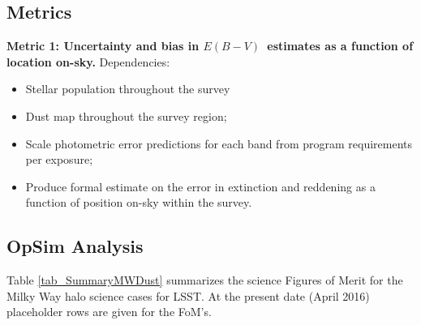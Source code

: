 
\subsection{Metrics}

\label{sec:\secname:metrics}

{\bf Metric 1: Uncertainty and bias in $E(B-V)$~estimates as a
  function of location on-sky.} Dependencies:

\begin{itemize}
  \item Stellar population throughout the survey %
    \item Dust map throughout the survey region;
    \item Scale photometric error predictions for each band from program requirements per exposure;
      \item Produce formal estimate on the error in extinction and reddening as a function of position on-sky within the survey.
\end{itemize}



\subsection{OpSim Analysis}
\label{sec:\secname:analysis}

Table \ref{tab_SummaryMWDust} summarizes the science Figures of Merit
for the Milky Way halo science cases for LSST. 
At the present date (April
2016) placeholder rows are given for the FoM's.






